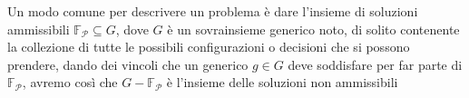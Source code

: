 \documentclass{report}
\begin{document}
Un modo comune per descrivere un problema è dare l'insieme di soluzioni ammissibili $ \mathbb{F}_{\mathcal{P}} \subseteq G $, dove $G$ è un sovrainsieme generico noto, di solito contenente la collezione di tutte le possibili configurazioni o decisioni che si possono prendere, dando dei vincoli che un generico $ g \in G $ deve soddisfare per far parte di $\mathbb{F}_{\mathcal{P}}$, avremo così che $G - \mathbb{F}_{\mathcal{P}}$ è l'insieme delle soluzioni non ammissibili 
\end{document}
